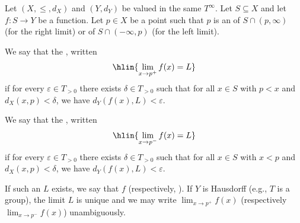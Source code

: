 \begin{definition} \label{definition:right_limit_and_left_limit_of_a_function_in_an_ordered_extended_metric_space}
    Let $(X, \leq, d_X)$ and $(Y, d_Y)$ be  valued in the same  $T^\infty$. Let $S \subseteq X$ and let $f: S \to Y$ be a function. Let $p \in X$ be a point such that $p$ is an  of $S \cap (p, \infty)$ (for the right limit) or of $S \cap (-\infty, p)$ (for the left limit).

    We say that the , written
    $$\hlin{\lim_{x \to p^+} f(x) = L}$$
    if for every $\varepsilon \in T_{>0}$ there exists $\delta \in T_{>0}$ such that for all $x \in S$ with $p < x$ and $d_X(x, p) < \delta$, we have $d_Y(f(x), L) < \varepsilon$.

    We say that the , written
    $$\hlin{\lim_{x \to p^-} f(x) = L}$$
    if for every $\varepsilon \in T_{>0}$ there exists $\delta \in T_{>0}$ such that for all $x \in S$ with $x < p$ and $d_X(x, p) < \delta$, we have $d_Y(f(x), L) < \varepsilon$.

    If such an $L$ exists, we say that $f$  (respectively, ). If $Y$ is Hausdorff (e.g., $T$ is a group), the limit $L$ is unique and we may write $\lim_{x \to p^+} f(x)$ (respectively $\lim_{x \to p^-} f(x)$) unambiguously.

\end{definition}